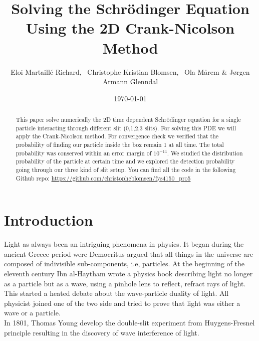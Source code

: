 \documentclass[english,notitlepage,reprint,nofootinbib]{revtex4-2}  %
\begin{document}
	
	\title{Solving the Schrödinger Equation Using the 2D Crank-Nicolson Method}  %
	\author{Eloi Martaillé Richard,
	\
	Christophe Kristian Blomsen,
	\
	Ola Mårem
	\&
	Jørgen Armann Glenndal
    }
	\date{\today}                             %
	\noaffiliation                            %
	
	\begin{abstract}
	This paper solve numerically the 2D time dependent Schrödinger equation for a single particle 
	interacting through different slit (0,1,2,3 slits). For solving this PDE we will apply the 
	Crank-Nicolson method. For convergence check we verified that the probability of finding our
	particle inside the box remain 1 at all time. The total probability was conserved within an 
	error margin of  $10^{-14}$. We studied the distribution probability of the particle at certain
	time and we explored the detection probability going through our three kind of slit setup. 
	You can find all the code in the following Github repo:	
	\href{https://github.com/christopheblomsen/fys4150_pro5}{https://github.com/christopheblomsen/fys4150\_pro5}
\end{abstract}
	\maketitle	
	
	
	\section{Introduction} \label{sec:introduction}

	Light as always been an intriguing phenomena in physics. It began during the ancient Greece
	period were Democritus argued that all things in the universe are composed of indivisible 
	sub-components, i.e, particles. At the beginning of the eleventh century Ibn al-Haytham 
	wrote a physics book describing light no longer as a particle but as a wave, using a 
	pinhole lens to reflect, refract rays of light. This started a heated debate about the 
	wave-particle duality of light. All physicist joined one of the two side and tried to 
	prove that light was either a wave or a particle. \\
	
	In 1801, Thomas Young develop the double-slit experiment from Huygens-Fresnel principle
	resulting in the discovery of wave interference of light\cite{ThomasYoung}.
\end{document}
